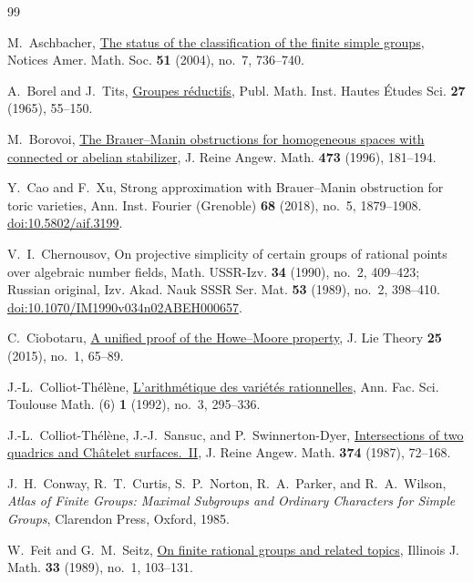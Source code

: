 \begin{thebibliography}{99}

M.~Aschbacher,
\href{https://www.ams.org/notices/200407/fea-aschbacher.pdf}{The status
of the classification of the finite simple groups},
Notices Amer. Math. Soc. \textbf{51} (2004), no.~7, 736--740.

A.~Borel and J.~Tits,
\href{https://doi.org/10.1007/BF02684375}{Groupes r\'eductifs},
Publ. Math. Inst. Hautes \'Etudes Sci. \textbf{27} (1965), 55--150.

M.~Borovoi,
\href{https://doi.org/10.1515/crll.1995.473.181}{The Brauer--Manin
obstructions for homogeneous spaces with connected or abelian stabilizer},
J. Reine Angew. Math. \textbf{473} (1996), 181--194.

Y.~Cao and F.~Xu,
Strong approximation with Brauer--Manin obstruction for toric varieties,
Ann. Inst. Fourier (Grenoble) \textbf{68} (2018), no.~5, 1879--1908.
\href{https://doi.org/10.5802/aif.3199}{doi:10.5802/aif.3199}.

V.~I.~Chernousov,
On projective simplicity of certain groups of rational points over
algebraic number fields,
Math. USSR-Izv. \textbf{34} (1990), no.~2, 409--423;
Russian original, Izv. Akad. Nauk SSSR Ser. Mat.
\textbf{53} (1989), no.~2, 398--410.
\href{https://doi.org/10.1070/IM1990v034n02ABEH000657}
{doi:10.1070/IM1990v034n02ABEH000657}.

C.~Ciobotaru,
\href{https://doi.org/10.5802/jolt.828}{A unified proof of the Howe--Moore
property},
J. Lie Theory \textbf{25} (2015), no.~1, 65--89.

J.-L.~Colliot-Th\'el\`ene,
\href{https://doi.org/10.5802/afst.751}{L'arithm\'etique des vari\'et\'es
rationnelles},
Ann. Fac. Sci. Toulouse Math. (6) \textbf{1} (1992), no.~3, 295--336.

J.-L.~Colliot-Th\'el\`ene, J.-J.~Sansuc, and P.~Swinnerton-Dyer,
\href{https://doi.org/10.1515/crll.1987.374.72}{Intersections of two
quadrics and Ch\^atelet surfaces.~II},
J. Reine Angew. Math. \textbf{374} (1987), 72--168.

J.~H.~Conway, R.~T.~Curtis, S.~P.~Norton, R.~A.~Parker, and R.~A.~Wilson,
\emph{Atlas of Finite Groups: Maximal Subgroups and Ordinary Characters
for Simple Groups},
Clarendon Press, Oxford, 1985.

W.~Feit and G.~M.~Seitz,
\href{https://doi.org/10.1215/ijm/1255988808}{On finite rational groups
and related topics},
Illinois J. Math. \textbf{33} (1989), no.~1, 103--131.


\end{thebibliography}
